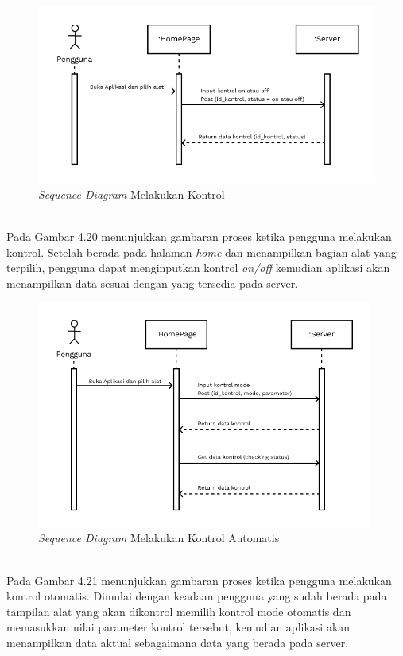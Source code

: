 \begin{flushleft}
\begin{justify}
\begin{enumerate}[label=\alph*.]
            \begin{figure}[ht]
                \centering
                \includegraphics[width=12cm]{images/bab 4/Sequence kontrol.png}
                \caption{\textit{Sequence Diagram} Melakukan Kontrol}
            \end{figure}
            \\Pada Gambar 4.20 menunjukkan gambaran proses ketika pengguna melakukan kontrol. Setelah berada pada halaman \emph{home} dan menampilkan bagian alat yang terpilih, pengguna dapat menginputkan kontrol \emph{on/off} kemudian aplikasi akan menampilkan data sesuai dengan yang tersedia pada server.
            \begin{figure}[ht]
                \centering
                \includegraphics[width=11cm]{images/bab 4/Sequence kontrol Auto.png}
                \caption{\textit{Sequence Diagram} Melakukan Kontrol Automatis}
            \end{figure}
            \\Pada Gambar 4.21 menunjukkan gambaran proses ketika pengguna melakukan kontrol otomatis. Dimulai dengan keadaan pengguna yang sudah berada pada tampilan alat yang akan dikontrol memilih kontrol mode otomatis dan memasukkan nilai parameter kontrol tersebut, kemudian aplikasi akan menampilkan data aktual sebagaimana data yang berada pada server.
            \end{enumerate}


\end{justify}
\end{flushleft}
